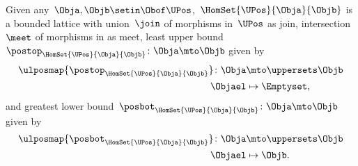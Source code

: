 \begin{lemma}
    \label{lem:UPos-is-bounded-lattice}
    Given any~$\Obja,\Objb\setin \Obof\UPos$,~$\HomSet{\UPos}{\Obja}{\Objb}$ is a bounded lattice with union~$\join$ of morphisms in~$\UPos$ as join, intersection~$\meet$ of morphisms in \UPos as meet, least upper bound~$\postop_{\HomSet{\UPos}{\Obja}{\Objb}}\colon \Obja \mto \Objb$ given by
    \begin{equation}
        \begin{aligned}
            \ulposmap{\postop_{\HomSet{\UPos}{\Obja}{\Objb}}}\colon \Obja & \mto \uppersets \Objb \\
            \Objael                                                       & \mapsto \Emptyset,
        \end{aligned}
    \end{equation}
    and greatest lower bound~$\posbot_{\HomSet{\UPos}{\Obja}{\Objb}}\colon \Obja \mto \Objb$ given by
    \begin{equation}
        \begin{aligned}
            \ulposmap{\posbot_{\HomSet{\UPos}{\Obja}{\Objb}}}\colon \Obja & \mto \uppersets \Objb \\
            \Objael                                                       & \mapsto \Objb.
        \end{aligned}
    \end{equation}
\end{lemma}
